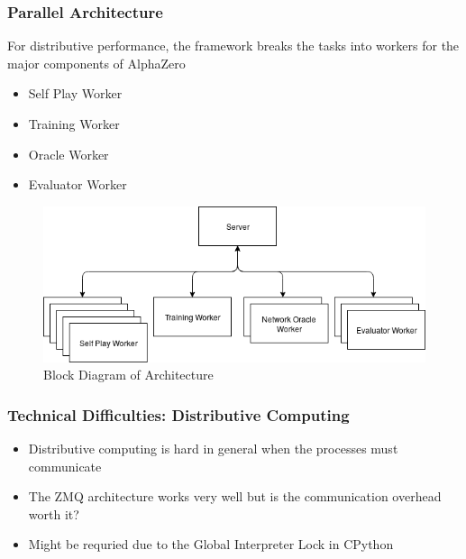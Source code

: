 \documentclass{beamer}
\begin{document}
\begin{frame}
  \frametitle{Parallel Architecture}
  For distributive performance, the framework breaks the tasks into workers for the major components of AlphaZero
  \begin{itemize}
    \item Self Play Worker
    \item Training Worker
    \item Oracle Worker
    \item Evaluator Worker
  \end{itemize}
  \begin{figure}
    \includegraphics[width=0.5\linewidth]{./images/architecture.png}
    \caption{Block Diagram of Architecture}
  \end{figure}
\end{frame}



\begin{frame}
  \frametitle{Technical Difficulties: Distributive Computing}

  \begin{itemize}
    \item Distributive computing is hard in general when the processes must communicate
    \item The ZMQ architecture works very well but is the communication overhead worth it?
    \item Might be requried due to the Global Interpreter Lock in CPython
  \end{itemize}
\end{frame}


\end{document}
